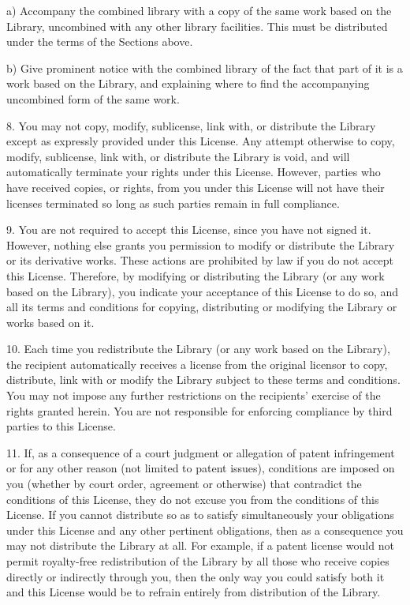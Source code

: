 \documentclass[a4paper,twoside]{tceusermanual}
\begin{document}
    a) Accompany the combined library with a copy of the same work
    based on the Library, uncombined with any other library
    facilities.  This must be distributed under the terms of the
    Sections above.

    b) Give prominent notice with the combined library of the fact
    that part of it is a work based on the Library, and explaining
    where to find the accompanying uncombined form of the same work.

8. You may not copy, modify, sublicense, link with, or
distribute the Library except as expressly provided under this
License.  Any attempt otherwise to copy, modify, sublicense,
link with, or distribute the Library is void, and will
automatically terminate your rights under this License.
However, parties who have received copies, or rights, from you
under this License will not have their licenses terminated so
long as such parties remain in full compliance.

9. You are not required to accept this License, since you have
not signed it.  However, nothing else grants you permission to
modify or distribute the Library or its derivative works.  These
actions are prohibited by law if you do not accept this
License.  Therefore, by modifying or distributing the Library
(or any work based on the Library), you indicate your acceptance
of this License to do so, and all its terms and conditions for
copying, distributing or modifying the Library or works based on
it.

10. Each time you redistribute the Library (or any work based on
the Library), the recipient automatically receives a license
from the original licensor to copy, distribute, link with or
modify the Library subject to these terms and conditions.  You
may not impose any further restrictions on the recipients'
exercise of the rights granted herein. You are not responsible
for enforcing compliance by third parties to this License.
 
11. If, as a consequence of a court judgment or allegation of
patent infringement or for any other reason (not limited to
patent issues), conditions are imposed on you (whether by court
order, agreement or otherwise) that contradict the conditions of
this License, they do not excuse you from the conditions of this
License.  If you cannot distribute so as to satisfy
simultaneously your obligations under this License and any other
pertinent obligations, then as a consequence you may not
distribute the Library at all.  For example, if a patent license
would not permit royalty-free redistribution of the Library by
all those who receive copies directly or indirectly through you,
then the only way you could satisfy both it and this License
would be to refrain entirely from distribution of the Library.
\end{document}
